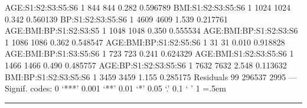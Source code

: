 \documentclass[runningheads]{llncs}
\newenvironment{lcverbatim}
 {\SaveVerbatim{cverb}}
 {\endSaveVerbatim
  \flushleft\fboxrule=0pt\fboxsep=.5em
  \colorbox{cverbbg}{%
    \makebox[\dimexpr\linewidth-2\fboxsep][l]{\BUseVerbatim{cverb}}%
  }
  \endflushleft
}
\begin{document}
\begin{lcverbatim}
AGE:S1:S2:S3:S5:S6      1    844     844   0.282 0.596789    
BMI:S1:S2:S3:S5:S6      1   1024    1024   0.342 0.560139    
BP:S1:S2:S3:S5:S6       1   4609    4609   1.539 0.217761    
AGE:BMI:BP:S1:S2:S3:S5  1   1048    1048   0.350 0.555534    
AGE:BMI:BP:S1:S2:S3:S6  1   1086    1086   0.362 0.548547    
AGE:BMI:BP:S1:S2:S5:S6  1     31      31   0.010 0.918828    
AGE:BMI:BP:S1:S3:S5:S6  1    723     723   0.241 0.624329    
AGE:BMI:S1:S2:S3:S5:S6  1   1466    1466   0.490 0.485757    
AGE:BP:S1:S2:S3:S5:S6   1   7632    7632   2.548 0.113632    
BMI:BP:S1:S2:S3:S5:S6   1   3459    3459   1.155 0.285175    
Residuals              99 296537    2995                     
---
Signif. codes:  0 ‘***’ 0.001 ‘**’ 0.01 ‘*’ 0.05 ‘.’ 0.1 ‘ ’ 1
\end{lcverbatim}
\hrule
\vspace{0.5cm}
\end{document}

